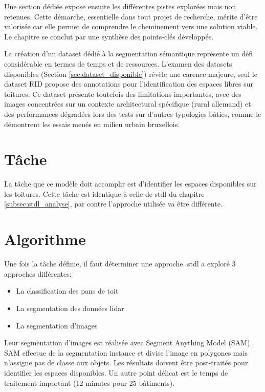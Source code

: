 Une section dédiée expose ensuite les différentes pistes explorées mais non retenues. Cette démarche, essentielle dans tout projet de recherche, mérite d'être valorisée car elle permet de comprendre le cheminement vers une solution viable. Le chapitre se conclut par une synthèse des points-clés développés.

La création d'un dataset dédié à la segmentation sémantique représente un défi considérable en termes de temps et de ressources. L'examen des datasets disponibles (Section \ref{sec:dataset_disponible}) révèle une carence majeure, seul le dataset RID propose des annotations pour l'identification des espaces libres sur toitures. Ce dataset présente toutefois des limitations importantes, avec des images concentrées sur un contexte architectural spécifique (rural allemand) et des performances dégradées lors des tests sur d'autres typologies bâties, comme le démontrent les essais menés en milieu urbain bruxellois.

\section{Tâche}
La tâche que ce modèle doit accomplir est d'identifier les espaces disponibles sur les toitures. Cette tâche est identique à celle de \acrshort{stdl} du chapitre \ref{subsec:stdl_analyse}, par contre l'approche utilisée va être différente.

\section{Algorithme}
Une fois la tâche définie, il faut déterminer une approche. \acrshort{stdl} a exploré 3 approches différentes:
\begin{itemize}
    \item La classification des pans de toit
    \item La segmentation des données \gls{lidar}
    \item La segmentation d'images
\end{itemize}

Leur segmentation d'images est réalisée avec Segment Anything Model (SAM). SAM effectue de la segmentation instance et divise l'image en polygones mais n'assigne pas de classe aux objets. Les résultats doivent être post-traités pour identifier les espaces disponibles. Un autre point délicat est le temps de traitement important (12 minutes pour 25 bâtiments).

